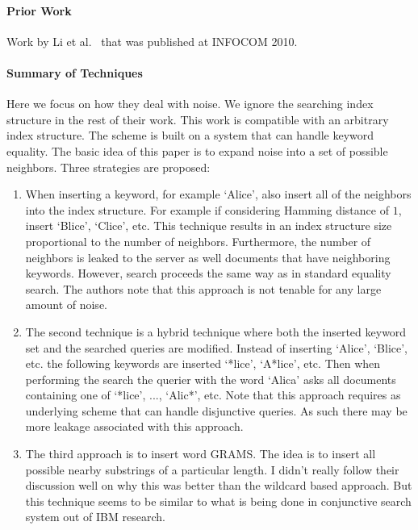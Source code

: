 \paragraph{Prior Work}


Work by Li et al.~\cite{li2010fuzzy,wang2013efficient} that was published at INFOCOM 2010.  

\paragraph{Summary of Techniques}  Here we focus on how they deal with noise.  We ignore the searching index structure in the rest of their work.  This work is compatible with an arbitrary index structure.  The scheme is built on a system that can handle keyword equality.  The basic idea of this paper is to expand noise into a set of possible neighbors.  Three strategies are proposed:

\begin{enumerate}
\item When inserting a keyword, for example `Alice', also insert all of the neighbors into the index structure.  For example if considering Hamming distance of $1$, insert `Blice', `Clice', etc.  This technique results in an index structure size proportional to the number of neighbors.  Furthermore, the number of neighbors is leaked to the server as well documents that have neighboring keywords.  However, search proceeds the same way as in standard equality search.  The authors note that this approach is not tenable for any large amount of noise.
\item The second technique is a hybrid technique where both the inserted keyword set and the searched queries are modified.  Instead of inserting `Alice', `Blice', etc. the following keywords are inserted `*lice', `A*lice', etc.  Then when performing the search the querier with the word `Alica' asks all documents containing one of `*lice', ..., `Alic*', etc.  Note that this approach requires as underlying scheme that can handle disjunctive queries.  As such there may be more leakage associated with this approach.
\item The third approach is to insert word GRAMS.  The idea is to insert all possible nearby substrings of a particular length.  I didn't really follow their discussion well on why this was better than the wildcard based approach.  But this technique seems to be similar to what is being done in conjunctive search system out of IBM research.
\end{enumerate}

